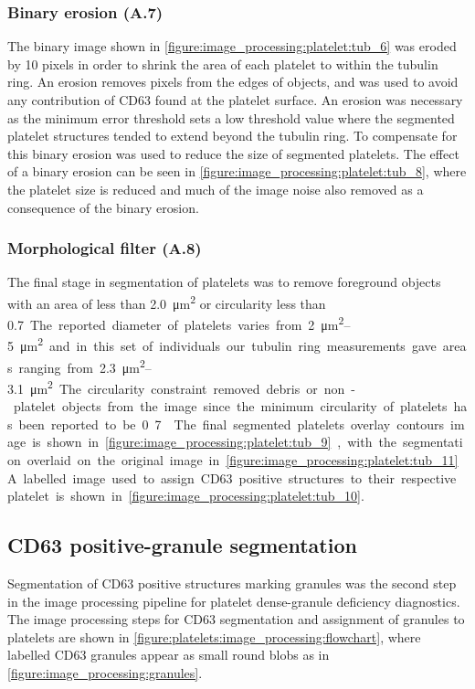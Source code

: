 \subsubsection{Binary erosion (A.7)}
The binary image shown in \autoref{figure:image_processing:platelet:tub_6} was eroded by 10 pixels in order to shrink the area of each platelet to within the tubulin ring. An erosion removes pixels from the edges of objects, and was used to avoid any contribution of CD63 found at the platelet surface. An erosion was necessary as the minimum error threshold sets a low threshold value where the segmented platelet structures tended to extend beyond the tubulin ring. To compensate for this binary erosion was used to reduce the size of segmented platelets. The effect of a binary erosion can be seen in \autoref{figure:image_processing:platelet:tub_8}, where the platelet size is reduced and much of the image noise also removed as a consequence of the binary erosion.

\subsubsection{Morphological filter (A.8)}
The final stage in segmentation of platelets was to remove foreground objects with an area of less than \SI{2.0}{\micro\meter\squared} or circularity less than \SI{0.7}. The reported diameter of platelets varies from \SIrange{2}{5}{\micro\meter\squared} and in this set of individuals our tubulin ring measurements gave areas ranging from \SIrange{2.3}{3.1}{\micro\meter\squared}. The circularity constraint removed debris or non-platelet objects from the image since the minimum circularity of platelets has been reported to be 0.7~\cite{Kraus2013}. The final segmented platelets overlay contours image is shown in \autoref{figure:image_processing:platelet:tub_9}, with the segmentation overlaid on the original image in \autoref{figure:image_processing:platelet:tub_11}. A labelled image used to assign CD63 positive structures to their respective platelet is shown in \autoref{figure:image_processing:platelet:tub_10}.

\subsection{CD63 positive-granule segmentation}
\label{platelets:image_processing:granules}
Segmentation of CD63 positive structures marking granules was the second step in the image processing pipeline for platelet dense-granule deficiency diagnostics. The image processing steps for CD63 segmentation and assignment of granules to platelets are shown in \autoref{figure:platelets:image_processing:flowchart}, where labelled CD63 granules appear as small round blobs as in \autoref{figure:image_processing:granules}.

